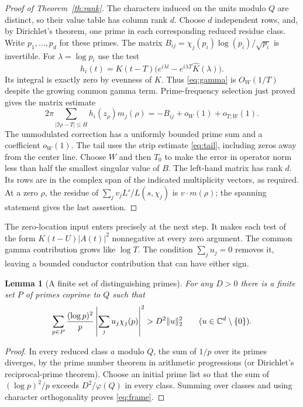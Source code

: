 \documentclass[11pt]{article}
\newtheorem{lemma}[theorem]{Lemma}
\newcommand{\wh}{\widehat}
\begin{document}
\begin{proof}[Proof of Theorem~\ref{th:rank}]
The characters induced on the
units modulo $Q$ are distinct, so their value table has column rank $d$.
Choose $d$ independent rows, and, by Dirichlet's theorem, one prime in
each corresponding reduced residue class. Write $p_1,\ldots,p_d$ for these
primes. The matrix $B_{ij}=\chi_j(p_i)\log(p_i)/\sqrt{p_i}$ is invertible.
For $\lambda=\log p_i$ use the test
\[
 h_i(t)=K(t-T)\big(e^{i\lambda t}-e^{i\lambda T}\wh K(\lambda)\big).
\]
Its integral is exactly zero by evenness of $K$. Thus \eqref{eq:gamma}
is $O_W(1/T)$ despite the growing common gamma term. Prime-frequency
selection just proved gives the matrix estimate
\[
 2\pi\!\sum_{|\Im\rho-T|\le H}h_i(z_\rho)m_j(\rho)
   =-B_{ij}+o_W(1)+o_{T;W}(1).
\]
The unmodulated correction has a uniformly bounded prime sum and a
coefficient $o_W(1)$. The tail uses the strip estimate \eqref{eq:tail},
including zeros away from the center line. Choose $W$ and then $T_0$ to
make the error in operator norm less than half the smallest singular value
of $B$. The left-hand matrix has rank $d$. Its rows are in the complex
span of the indicated multiplicity vectors, as required. At a zero $\rho$,
the residue of $\sum_j v_j L'/L(s,\chi_j)$ is $v\cdot m(\rho)$;
the spanning statement gives the last assertion.
\end{proof}

The zero-location input enters precisely at the next step. It makes each
test of the form $K(t-U)|A(t)|^2$ nonnegative at every zero argument.
The common gamma contribution grows like $\log T$. The condition
$\sum_j u_j=0$ removes it, leaving a bounded conductor contribution that
can have either sign.

\begin{lemma}[A finite set of distinguishing primes]\label{lem:primes}
For any $D>0$ there is a finite set $P$ of primes coprime to $Q$ such that
\begin{equation}
 \sum_{p\in P}\frac{(\log p)^2}{p}\left|\sum_j u_j\chi_j(p)\right|^2
       > D^2\|u\|_2^2 \qquad (u\in\mathbb C^d\setminus\{0\}).
 \label{eq:frame}
\end{equation}
\end{lemma}
\begin{proof}
In every reduced class $a$ modulo $Q$, the sum of $1/p$ over its primes
diverges, by the prime number theorem in arithmetic progressions
(or Dirichlet's reciprocal-prime theorem). Choose an initial prime list
so that the sum of $(\log p)^2/p$ exceeds $D^2/\varphi(Q)$ in
every class. Summing over classes and using character orthogonality proves
\eqref{eq:frame}.
\end{proof}
\end{document}
